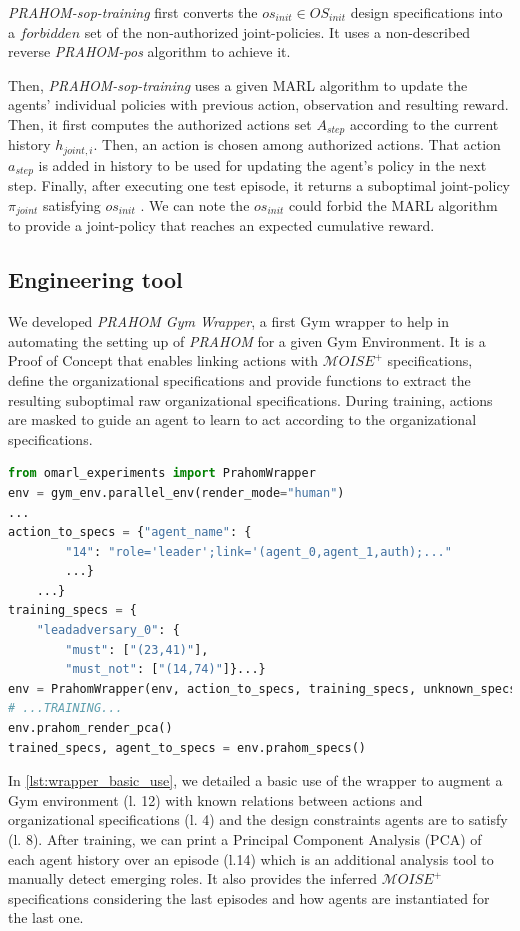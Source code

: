 \documentclass[runningheads]{llncs}
\newcounter{relation}
\begin{document}
\emph{PRAHOM-sop-training} first converts the $os_{init} \in OS_{init}$ design specifications into a $forbidden$ set of the non-authorized joint-policies. It uses a non-described reverse \emph{PRAHOM-pos} algorithm to achieve it.

Then, \emph{PRAHOM-sop-training} uses a given MARL algorithm to update the agents' individual policies with previous action, observation and resulting reward. Then, it first computes the authorized actions set $A_{step}$ according to the current history $h_{joint,i}$. Then, an action is chosen among authorized actions. That action $a_{step}$ is added in history to be used for updating the agent's policy in the next step.
Finally, after executing one test episode, it returns a suboptimal joint-policy $\pi_{joint}$ satisfying $os_{init}$
. We can note the $os_{init}$ could forbid the MARL algorithm to provide a joint-policy that reaches an expected cumulative reward.


\subsection{Engineering tool}

We developed \emph{PRAHOM Gym Wrapper}\label{gym-wrapper}, a first Gym wrapper to help in automating the setting up of \emph{PRAHOM} for a given Gym Environment.
It is a Proof of Concept that enables linking actions with $\mathcal{M}OISE^+$ specifications, define the organizational specifications and provide functions to extract the resulting suboptimal raw organizational specifications. During training, actions are masked to guide an agent to learn to act according to the organizational specifications.

\begin{lstlisting}[language=Python, caption=PRAHOM Gym Wrapper basic use, label={lst:wrapper_basic_use}]
from omarl_experiments import PrahomWrapper
env = gym_env.parallel_env(render_mode="human")
...
action_to_specs = {"agent_name": {
        "14": "role='leader';link='(agent_0,agent_1,auth);..."
        ...}    
    ...}
training_specs = {
    "leadadversary_0": {
        "must": ["(23,41)"],
        "must_not": ["(14,74)"]}...}
env = PrahomWrapper(env, action_to_specs, training_specs, unknown_specs_inference=True, pca_output=True)
# ...TRAINING...
env.prahom_render_pca()
trained_specs, agent_to_specs = env.prahom_specs()
\end{lstlisting}

In \autoref{lst:wrapper_basic_use}, we detailed a basic use of the wrapper to augment a Gym environment (l. 12) with known relations between actions and organizational specifications (l. 4) and the design constraints agents are to satisfy (l. 8). After training, we can print a Principal Component Analysis (PCA) of each agent history over an episode (l.14) which is an additional analysis tool to manually detect emerging roles. It also provides the inferred $\mathcal{M}OISE^+$ specifications considering the last episodes and how agents are instantiated for the last one.
\end{document}
